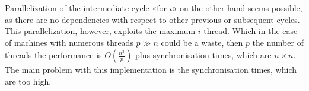 Parallelization of the intermediate cycle «for \(i\)» on the other hand seems possible, as there are no dependencies with respect to other previous or subsequent cycles.
This parallelization, however, exploits the maximum \(i\) thread.
Which in the case of machines with numerous threads \(p \gg n\) could be a waste, then \(p\) the number of threads the performance is \(\displaystyle O\left(\frac{n^3}{p}\right)\) plus synchronisation times, which are \(n\times n\).
The main problem with this implementation is the synchronisation times, which are too high.





%

